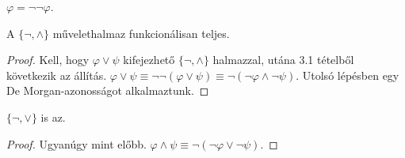 \begin{exmpl} $\varphi = \lnot \lnot \varphi$.
\end{exmpl}
\begin{theo} A $\lbrace \lnot, \land \rbrace$ művelethalmaz funkcionálisan teljes.
\end{theo}
\begin{proof} Kell, hogy $\varphi \lor \psi$ kifejezhető $\lbrace \lnot, \land \rbrace$ halmazzal, utána 3.1 tételből következik az állítás.
$\varphi \lor \psi \equiv \lnot \lnot (\varphi \lor \psi) \equiv \lnot (\lnot \varphi \land \lnot \psi)$. Utolsó lépésben egy De Morgan-azonosságot alkalmaztunk.
\end{proof}
\begin{theo} $\lbrace \lnot, \lor \rbrace$ is az.
\end{theo}
\begin{proof} Ugyanúgy mint előbb. $\varphi \land \psi \equiv \lnot(\lnot \varphi \lor \lnot \psi)$.
\end{proof}